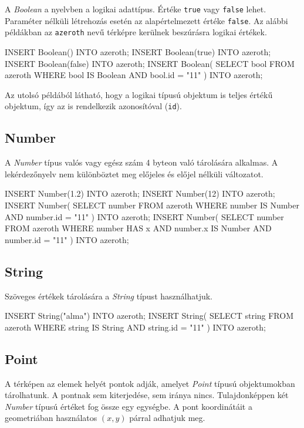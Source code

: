 A \textit{Boolean} a nyelvben a logikai adattípus. Értéke \texttt{true} vagy \texttt{false} lehet. Paraméter nélküli létrehozás esetén az alapértelmezett értéke \texttt{false}. Az alábbi példákban az \texttt{azeroth} nevű térképre kerülnek beszúrásra logikai értékek.

\begin{sql}
INSERT Boolean() INTO azeroth;
INSERT Boolean(true) INTO azeroth; 
INSERT Boolean(false) INTO azeroth;
INSERT Boolean(
    SELECT bool FROM azeroth
    WHERE bool IS Boolean AND bool.id = "11"
) INTO azeroth;
\end{sql}

Az utolsó példából látható, hogy a logikai típusú objektum is teljes értékű objektum, így az is rendelkezik azonosítóval (\texttt{id}).

\subsection{Number}

A \textit{Number} típus valós vagy egész szám 4 byteon való tárolására alkalmas. A lekérdezőnyelv nem különböztet meg előjeles és előjel nélküli változatot.

\begin{sql}
INSERT Number(1.2) INTO azeroth;
INSERT Number(12) INTO azeroth;
INSERT Number(
    SELECT number FROM azeroth
    WHERE number IS Number AND number.id = "11"
) INTO azeroth;
INSERT Number(
    SELECT number FROM azeroth
    WHERE number HAS x AND number.x IS Number AND number.id = "11"
) INTO azeroth;
\end{sql}

\subsection{String}

Szöveges értékek tárolására a \textit{String} típust használhatjuk.

\begin{sql}
INSERT String("alma") INTO azeroth;
INSERT String(
    SELECT string FROM azeroth
    WHERE string IS String AND string.id = "11"
)
INTO azeroth;
\end{sql}

\subsection{Point}

A térképen az elemek helyét pontok adják, amelyet \textit{Point} típusú objektumokban tárolhatunk. A pontnak sem kiterjedése, sem iránya nincs. Tulajdonképpen két \textit{Number} típusú értéket fog össze egy egységbe. A pont koordinátáit a geometriában használatos $(x, y)$ párral adhatjuk meg.

